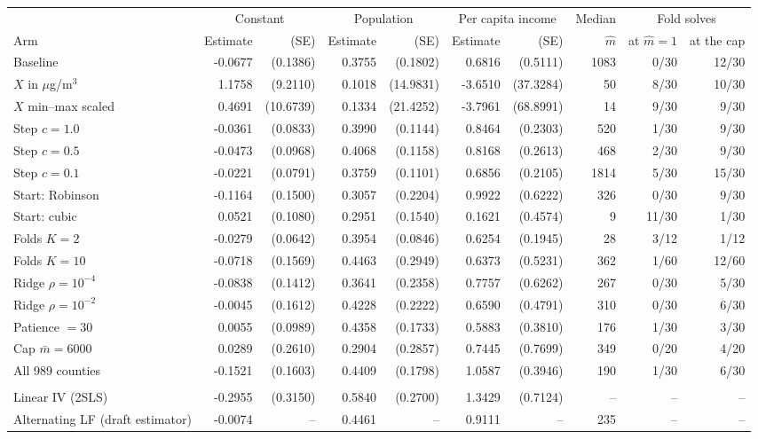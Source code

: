 \begin{tabular}{lrrrrrrrrr}
\toprule
& \multicolumn{2}{c}{Constant} & \multicolumn{2}{c}{Population} & \multicolumn{2}{c}{Per capita income} & Median & \multicolumn{2}{c}{Fold solves} \\
\cmidrule(lr){2-3} \cmidrule(lr){4-5} \cmidrule(lr){6-7} \cmidrule(lr){9-10}
Arm & Estimate & (SE) & Estimate & (SE) & Estimate & (SE) & $\hat m$ & at $\hat m = 1$ & at the cap \\
\midrule
Baseline & -0.0677 & (0.1386) & 0.3755 & (0.1802) & 0.6816 & (0.5111) & 1083 & 0/30 & 12/30 \\
$X$ in $\mu$g/m$^3$ & 1.1758 & (9.2110) & 0.1018 & (14.9831) & -3.6510 & (37.3284) & 50 & 8/30 & 10/30 \\
$X$ min--max scaled & 0.4691 & (10.6739) & 0.1334 & (21.4252) & -3.7961 & (68.8991) & 14 & 9/30 & 9/30 \\
Step $c = 1.0$ & -0.0361 & (0.0833) & 0.3990 & (0.1144) & 0.8464 & (0.2303) & 520 & 1/30 & 9/30 \\
Step $c = 0.5$ & -0.0473 & (0.0968) & 0.4068 & (0.1158) & 0.8168 & (0.2613) & 468 & 2/30 & 9/30 \\
Step $c = 0.1$ & -0.0221 & (0.0791) & 0.3759 & (0.1101) & 0.6856 & (0.2105) & 1814 & 5/30 & 15/30 \\
Start: Robinson & -0.1164 & (0.1500) & 0.3057 & (0.2204) & 0.9922 & (0.6222) & 326 & 0/30 & 9/30 \\
Start: cubic & 0.0521 & (0.1080) & 0.2951 & (0.1540) & 0.1621 & (0.4574) & 9 & 11/30 & 1/30 \\
Folds $K = 2$ & -0.0279 & (0.0642) & 0.3954 & (0.0846) & 0.6254 & (0.1945) & 28 & 3/12 & 1/12 \\
Folds $K = 10$ & -0.0718 & (0.1569) & 0.4463 & (0.2949) & 0.6373 & (0.5231) & 362 & 1/60 & 12/60 \\
Ridge $\rho = 10^{-4}$ & -0.0838 & (0.1412) & 0.3641 & (0.2358) & 0.7757 & (0.6262) & 267 & 0/30 & 5/30 \\
Ridge $\rho = 10^{-2}$ & -0.0045 & (0.1612) & 0.4228 & (0.2222) & 0.6590 & (0.4791) & 310 & 0/30 & 6/30 \\
Patience $= 30$ & 0.0055 & (0.0989) & 0.4358 & (0.1733) & 0.5883 & (0.3810) & 176 & 1/30 & 3/30 \\
Cap $\bar m = 6000$ & 0.0289 & (0.2610) & 0.2904 & (0.2857) & 0.7445 & (0.7699) & 349 & 0/20 & 4/20 \\
All 989 counties & -0.1521 & (0.1603) & 0.4409 & (0.1798) & 1.0587 & (0.3946) & 190 & 1/30 & 6/30 \\
\addlinespace
\multicolumn{10}{l}{\textit{Comparison estimators}} \\
Linear IV (2SLS) & -0.2955 & (0.3150) & 0.5840 & (0.2700) & 1.3429 & (0.7124) & -- & -- & -- \\
Alternating LF (draft estimator) & -0.0074 & -- & 0.4461 & -- & 0.9111 & -- & 235 & -- & -- \\
\bottomrule
\end{tabular}
